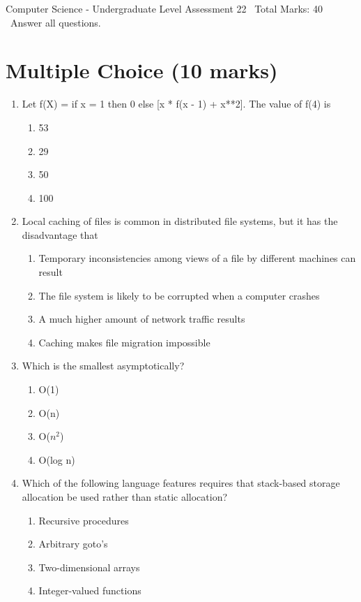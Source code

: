 \documentclass[12pt]{article}
\begin{document}
\begin{center}
Computer Science - Undergraduate Level Assessment 22 \
Total Marks: 40 \
Answer all questions.
\end{center}

\section*{Multiple Choice (10 marks)}
\begin{enumerate}[label=\arabic*.]
\item Let f(X) = if x = 1 then 0 else [x * f(x - 1) + x**2]. The value of f(4) is
\begin{enumerate}[label=(\alph*)]
    \item 53
    \item 29
    \item 50
    \item 100
\end{enumerate}
\item Local caching of files is common in distributed file systems, but it has the disadvantage that
\begin{enumerate}[label=(\alph*)]
    \item Temporary inconsistencies among views of a file by different machines can result
    \item The file system is likely to be corrupted when a computer crashes
    \item A much higher amount of network traffic results
    \item Caching makes file migration impossible
\end{enumerate}
\item Which is the smallest asymptotically?
\begin{enumerate}[label=(\alph*)]
    \item O(1)
    \item O(n)
    \item O($n^2$)
    \item O(log n)
\end{enumerate}
\item Which of the following language features requires that stack-based storage allocation be used rather than static allocation?
\begin{enumerate}[label=(\alph*)]
    \item Recursive procedures
    \item Arbitrary goto's
    \item Two-dimensional arrays
    \item Integer-valued functions

\end{enumerate}
\end{enumerate}
\end{document}
